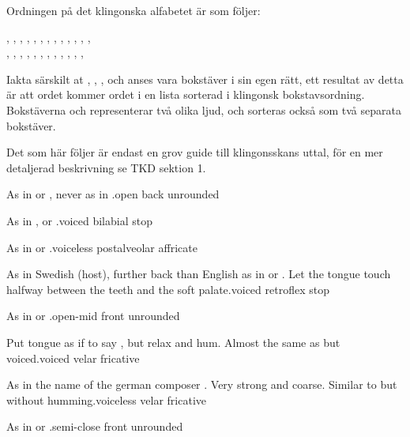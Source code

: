 
\noindent Ordningen på det klingonska alfabetet är som följer:

\begin{center}
, , , , , , , , ,
, , , , \\
, , , , , , , , ,
, , , 
\end{center}

\noindent Iakta särskilt at , , ,  och 
anses vara bokstäver i sin egen rätt, ett resultat av detta är att
ordet  kommer  ordet  i en lista sorterad i
klingonsk bokstavsordning. Bokstäverna  och  representerar
två olika ljud, och sorteras också som två separata bokstäver.

Det som här följer är endast en grov guide till klingonsskans uttal,
för en mer detaljerad beskrivning se TKD sektion 1.

\vspace{3mm}

%
  {\textipa{[A]} As in  or , never as in
  .}{open back unrounded}


%
  {\textipa{[b]} As in ,  or
  .}{voiced bilabial stop}

%
  {\textipa{[\t{tS}]} As in  or
  .}{voiceless postalveolar affricate}

%
  {\textipa{[\:d]} As in Swedish  (host), further back
  than English  as in  or . Let the
  tongue touch halfway between the teeth and the soft palate.}{voiced
  retroflex stop}

%
  {\textipa{[E]} As in  or .}{open-mid front
  unrounded}

%
  {\textipa{[G]} Put tongue as if to say , but relax and
  hum. Almost the same as  but voiced.}{voiced velar fricative}

%
  {\textipa{[x]} As in the name of the german composer
  . Very strong and coarse. Similar to  but without
  humming.}{voiceless velar fricative}

%
  {\textipa{[I]} As in  or .}{semi-close
  front unrounded}


